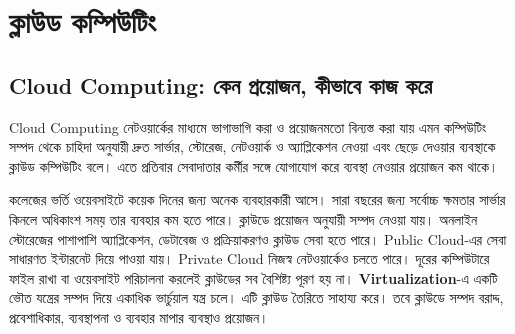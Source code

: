 \begingroup
\chTwoReadableTopicStyle
{}
\section{ক্লাউড কম্পিউটিং}
\subsection{Cloud Computing: কেন প্রয়োজন, কীভাবে কাজ করে}
\label{ch2:c10-01}
\begin{definitionbox}{Cloud Computing}
নেটওয়ার্কের মাধ্যমে ভাগাভাগি করা ও প্রয়োজনমতো বিন্যস্ত করা যায় এমন কম্পিউটিং সম্পদ থেকে চাহিদা অনুযায়ী দ্রুত সার্ভার, স্টোরেজ, নেটওয়ার্ক ও অ্যাপ্লিকেশন নেওয়া এবং ছেড়ে দেওয়ার ব্যবস্থাকে ক্লাউড কম্পিউটিং বলে। এতে প্রতিবার সেবাদাতার কর্মীর সঙ্গে যোগাযোগ করে ব্যবস্থা নেওয়ার প্রয়োজন কম থাকে।
\end{definitionbox}
কলেজের ভর্তি ওয়েবসাইটে কয়েক দিনের জন্য অনেক ব্যবহারকারী আসে। সারা বছরের জন্য সর্বোচ্চ ক্ষমতার সার্ভার কিনলে অধিকাংশ সময় তার ব্যবহার কম হতে পারে। ক্লাউডে প্রয়োজন অনুযায়ী সম্পদ নেওয়া যায়। অনলাইন স্টোরেজের পাশাপাশি অ্যাপ্লিকেশন, ডেটাবেজ ও প্রক্রিয়াকরণও ক্লাউড সেবা হতে পারে।
Public Cloud-এর সেবা সাধারণত ইন্টারনেট দিয়ে পাওয়া যায়। Private Cloud নিজস্ব নেটওয়ার্কেও চলতে পারে। দূরের কম্পিউটারে ফাইল রাখা বা ওয়েবসাইট পরিচালনা করলেই ক্লাউডের সব বৈশিষ্ট্য পূরণ হয় না। \textbf{Virtualization}-এ একটি ভৌত যন্ত্রের সম্পদ দিয়ে একাধিক ভার্চুয়াল যন্ত্র চলে। এটি ক্লাউড তৈরিতে সাহায্য করে। তবে ক্লাউডে সম্পদ বরাদ্দ, প্রবেশাধিকার, ব্যবস্থাপনা ও ব্যবহার মাপার ব্যবস্থাও প্রয়োজন।

